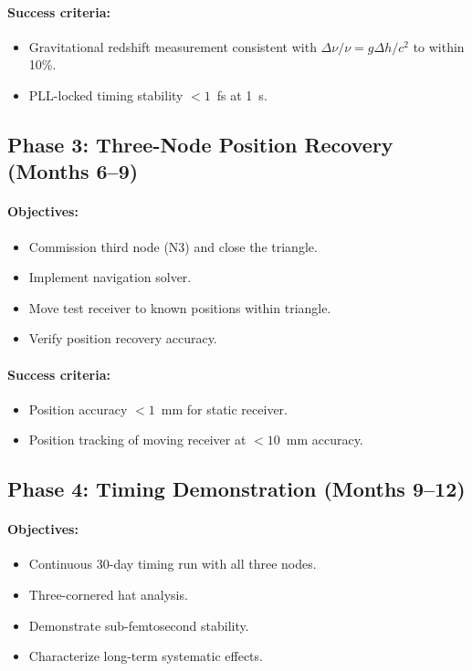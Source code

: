 \documentclass[12pt,letterpaper]{article}
\begin{document}
\paragraph{Success criteria:}
\begin{itemize}
\item Gravitational redshift measurement consistent with
$\Delta\nu/\nu = g\Delta h/c^2$ to within 10\%.
\item PLL-locked timing stability $< 1$~fs at 1~s.
\end{itemize}

\subsection{Phase 3: Three-Node Position Recovery (Months 6--9)}

\paragraph{Objectives:}
\begin{itemize}
\item Commission third node (N3) and close the triangle.
\item Implement navigation solver.
\item Move test receiver to known positions within triangle.
\item Verify position recovery accuracy.
\end{itemize}

\paragraph{Success criteria:}
\begin{itemize}
\item Position accuracy $< 1$~mm for static receiver.
\item Position tracking of moving receiver at $< 10$~mm accuracy.
\end{itemize}

\subsection{Phase 4: Timing Demonstration (Months 9--12)}

\paragraph{Objectives:}
\begin{itemize}
\item Continuous 30-day timing run with all three nodes.
\item Three-cornered hat analysis.
\item Demonstrate sub-femtosecond stability.
\item Characterize long-term systematic effects.
\end{itemize}
\end{document}
